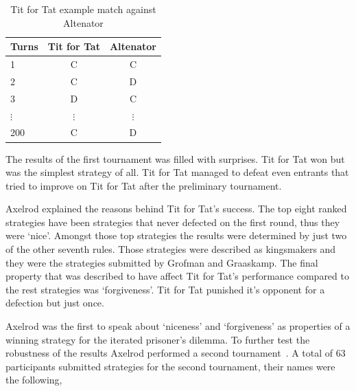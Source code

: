 \documentclass{article}
\begin{document}
\begin{table}[!hbtp]
    \begin{center}
    \begin{tabular}{lcc}
        \toprule
        Turns & Tit for Tat & Altenator\\
        \toprule
        1 & C & C\\
        2 & C & D\\
        3 & D & C\\ 
        $\vdots$ & $\vdots$ & $\vdots$ \\ 
        200 & C & D \\
        \bottomrule
    \end{tabular}
    \caption{Tit for Tat example match against Altenator}\label{table:tft_vs_a}
\end{center}
\end{table}

The results of the first tournament was filled with surprises. Tit for Tat won 
but was the simplest strategy of all. Tit for Tat managed to defeat even
entrants that tried to improve on Tit for Tat after the preliminary tournament.

Axelrod explained the reasons behind Tit for Tat's success. The top eight ranked
strategies have been strategies that never defected on the first round, thus they were
`nice'. Amongst those top strategies the results were determined by just two 
of the other seventh rules. Those strategies were described as kingsmakers and they 
were the strategies submitted by Grofman and Graaskamp. The final property
that was described to have affect Tit for Tat's performance compared to the 
rest strategies was `forgiveness'. Tit for Tat punished it's opponent for a 
defection but just once.

Axelrod was the first to speak about `niceness' and `forgiveness' as properties
of a winning strategy for the iterated prisoner's dilemma. To further test the
robustness of the results Axelrod performed a second tournament~\cite{axelrod1980b}.
A total of 63 participants submitted strategies for the second tournament, 
their names were the following,
\end{document}
